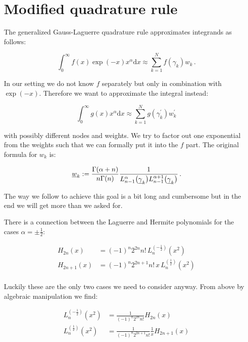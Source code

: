\documentclass[a4paper,10pt]{article}
\begin{document}
\section{Modified quadrature rule}

The generalized Gauss-Laguerre quadrature rule approximates
integrands as follows:

\begin{equation}
  \int_0^\infty f(x) \exp(-x) x^\alpha \mathrm{d}x
  \approx
  \sum_{k=1}^N f\left(\gamma_k\right) w_k \,.
\end{equation}

In our setting we do not know $f$ separately but only
in combination with $\exp(-x)$. Therefore we want to
approximate the integral instead:

\begin{equation}
  \int_0^\infty g(x) x^\alpha \mathrm{d}x
  \approx
  \sum_{k=1}^N g\left(\gamma_k^\prime\right) w_k^\prime
\end{equation}

with possibly different nodes and weights. We try to factor out
one exponential from the weights such that we can formally put
it into the $f$ part. The original formula for $w_k$ is:

\begin{equation}
  \underline{w}_k :=
  \frac{\Gamma(\alpha+n)}{n \Gamma(n)}
  \frac{1}{L^{\alpha}_{n-1}\bigl(\underline{\gamma}_k\bigr) L^{\alpha+1}_{n-1}\bigl(\underline{\gamma}_k\bigr)} \,.
\end{equation}

The way we follow to achieve this goal is a bit long and cumbersome
but in the end we will get more than we asked for.

There is a connection between the Laguerre and Hermite polynomials
for the cases $\alpha = \pm \frac{1}{2}$:

\begin{equation}
\begin{split}
  H_{2n}(x) & = (-1)^n 2^{2n} n! \, L_n^{\left(-\frac{1}{2}\right)}(x^2) \\
  H_{2n+1}(x) & = (-1)^n 2^{2n+1} n! \, x \, L_n^{\left(\frac{1}{2}\right)}(x^2) \\
\end{split}
\end{equation}

Luckily these are the only two cases we need to consider anyway.
From above by algebraic manipulation we find:

\begin{equation}
\begin{split}
  L_n^{\left(-\frac{1}{2}\right)}(x^2) & = \frac{1}{(-1)^n 2^{2n} n!} H_{2n}(x) \\
  L_n^{\left(\frac{1}{2}\right)}(x^2)  & = \frac{1}{(-1)^n 2^{2n+1} n!} \frac{1}{x} H_{2n+1}(x)
\end{split}
\end{equation}
\end{document}
